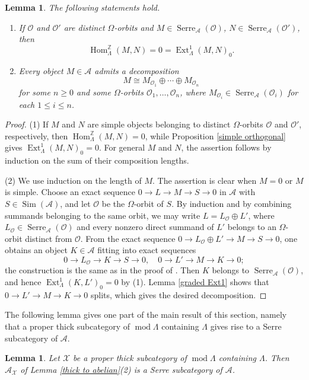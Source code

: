 \documentclass{amsart}
\newtheorem{lem}[thm]{Lemma}
\theoremstyle{definition}
\theoremstyle{remark}
\numberwithin{equation}{thm}
\def\A{\mathcal{A}}
\def\Ext{\operatorname{Ext}}
\def\gHom{\operatorname{Hom}^{\mathbb{Z}}}
\def\L{\Lambda}
\def\le{\leqslant}
\def\ge{\geqslant}
\def\mod{\operatorname{mod}}
\def\O{\mathcal{O}}
\def\Serre{\operatorname{Serre}}
\def\X{\mathcal{X}}
\begin{document}
\begin{lem}\label{orbit decomposition}
The following statements hold.
\begin{enumerate}[{\rm (1)}]
\item If $\O$ and $\O'$ are distinct $\Omega$-orbits and $M\in\Serre_{\A}(\O)$, $N\in\Serre_{\A}(\O')$, then $$\gHom_\L(M,N)=0=\Ext_\L^1(M,N)_0.$$
\item Every object $M\in\A$ admits a decomposition
$$
M\cong M_{\O_1}\oplus\cdots\oplus M_{\O_n}
$$
for some $n\ge0$ and some $\Omega$-orbits $\O_1,\ldots,\O_n$, where $M_{\O_i}\in\Serre_{\A}(\O_i)$ for each $1\le i\le n$.
\end{enumerate}
\end{lem}

\begin{proof}
(1) If $M$ and $N$ are simple objects belonging to distinct $\Omega$-orbits $\O$ and $\O'$, respectively, then $\gHom_\L(M,N)=0$, while Proposition \ref{simple orthogonal} gives $\Ext_\L^1(M,N)_0=0$. For general $M$ and $N$, the assertion follows by induction on the sum of their composition lengths.

(2) We use induction on the length of $M$. The assertion is clear when $M=0$ or $M$ is simple. Choose an exact sequence $0\to L\to M\to S\to0$ in $\A$ with $S\in\operatorname{Sim}(\A)$, and let $\O$ be the $\Omega$-orbit of $S$. By induction and by combining summands belonging to the same orbit, we may write $L=L_{\O}\oplus L'$, where $L_{\O}\in\Serre_{\A}(\O)$ and every nonzero direct summand of $L'$ belongs to an $\Omega$-orbit distinct from $\O$. From the exact sequence $0\to L_{\O}\oplus L'\to M\to S\to0$, one obtains an object $K\in\A$ fitting into exact sequences
$$
0\to L_{\O}\to K\to S\to0, \quad 0\to L'\to M\to K\to0;
$$
the construction is the same as in the proof of \cite[Lemma 3.1]{T06}. Then $K$ belongs to $\Serre_{\A}(\O)$, and hence $\Ext_\L^1(K,L')_0=0$ by (1). Lemma \ref{graded Ext1} shows that $0\to L'\to M\to K\to0$ splits, which gives the desired decomposition.
\end{proof}

The following lemma gives one part of the main result of this section, namely that a proper thick subcategory of $\mod\L$ containing $\L$ gives rise to a Serre subcategory of $\A$.

\begin{lem}\label{Serre}
Let $\X$ be a proper thick subcategory of $\mod\L$ containing $\L$.  Then $\A_\X$ of Lemma \ref{thick to abelian}(2) is a Serre subcategory of $\A$.
\end{lem}
\end{document}
